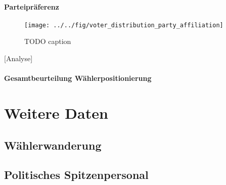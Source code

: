 \paragraph{Parteipräferenz}
\begin{figure}[htb]
	\centering
	\texttt{[image: ../../fig/voter\_distribution\_party\_affiliation]}
	\caption{TODO caption}
	\label{fig:voter-positions-pca-party-affiliation}
\end{figure}
[Analyse]

\paragraph{Gesamtbeurteilung Wählerpositionierung}


\section{Weitere Daten}\label{Sec-Weitere-Daten}

\subsection{Wählerwanderung}\label{Sec-Wählerwanderung}

\subsection{Politisches Spitzenpersonal}\label{Sec-Spitzenpersonal}
